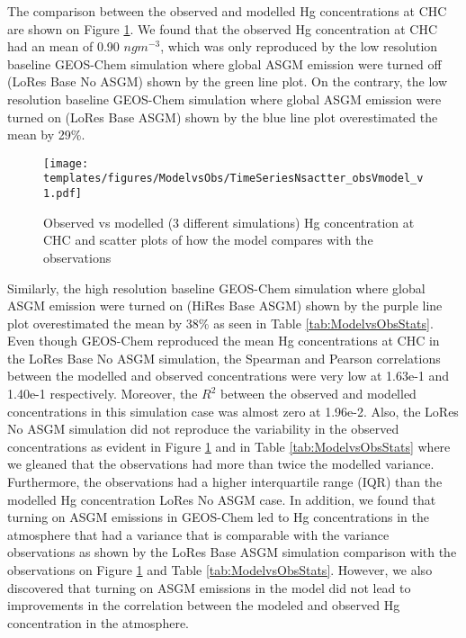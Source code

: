 \begin{flushleft}
 The comparison between the observed and modelled Hg concentrations at CHC are shown on Figure \ref{fig:ModelvsObsNstats}. We found that the observed Hg concentration at CHC had an mean of 0.90 $ngm^{-3}$, which was only reproduced by the low resolution baseline GEOS-Chem simulation where global ASGM emission were turned off (LoRes Base No ASGM) shown by the green line plot. On the contrary, the low resolution baseline GEOS-Chem simulation where global ASGM emission were turned on (LoRes Base ASGM) shown by the blue line plot overestimated the mean by 29\%.
\end{flushleft}


\begin{figure}[H]
  \texttt{[image: templates/figures/ModelvsObs/TimeSeriesNsactter\_obsVmodel\_v1.pdf]}
  \centering
  \caption{Observed vs modelled (3 different simulations) Hg concentration at CHC and scatter plots of how the model compares with the observations  }
  \label{fig:ModelvsObsNstats}
\end{figure}
\FloatBarrier
\begin{flushleft}
 Similarly, the high resolution baseline GEOS-Chem simulation where global ASGM emission were turned on (HiRes Base ASGM) shown by the purple line plot overestimated the mean by 38\% as seen in Table \ref{tab:ModelvsObsStats}. Even though GEOS-Chem reproduced the mean Hg concentrations at CHC in the LoRes Base No ASGM simulation, the Spearman and Pearson correlations between the modelled and observed concentrations were very low at  1.63e-1 and 1.40e-1 respectively. Moreover, the $R^2$ between the observed and modelled concentrations in this simulation case was almost zero at 1.96e-2. Also, the LoRes No ASGM simulation did not reproduce the variability in the observed concentrations as evident in Figure \ref{fig:ModelvsObsNstats} and in Table \ref{tab:ModelvsObsStats} where we gleaned that the observations had more than twice the modelled variance. Furthermore, the observations had a higher interquartile range (IQR) than the modelled Hg concentration LoRes No ASGM case. In addition, we found that turning on ASGM emissions in GEOS-Chem led to Hg concentrations in the atmosphere that had a variance that is comparable with the variance observations as shown by the LoRes Base ASGM simulation comparison with the observations on Figure \ref{fig:ModelvsObsNstats} and Table \ref{tab:ModelvsObsStats}. However, we also discovered that turning on ASGM emissions in the model did not lead to improvements in the correlation between the modeled and observed Hg concentration in the atmosphere. 
\end{flushleft}
